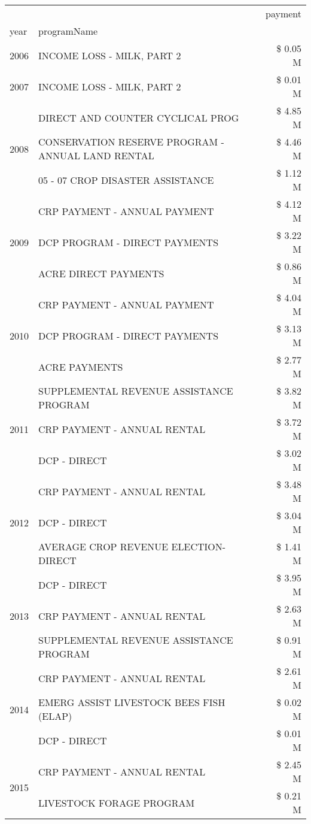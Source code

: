 \begin{tabular}{llr}
\toprule
 &  & payment \\
year & programName &  \\
\midrule
2006 & INCOME LOSS - MILK, PART 2 & \$ 0.05 M \\
\cline{1-3}
2007 & INCOME LOSS - MILK, PART 2 & \$ 0.01 M \\
\cline{1-3}
\multirow[t]{3}{*}{2008} & DIRECT AND COUNTER CYCLICAL PROG & \$ 4.85 M \\
 & CONSERVATION RESERVE PROGRAM - ANNUAL LAND RENTAL & \$ 4.46 M \\
 & 05 - 07 CROP DISASTER ASSISTANCE & \$ 1.12 M \\
\cline{1-3}
\multirow[t]{3}{*}{2009} & CRP PAYMENT - ANNUAL PAYMENT & \$ 4.12 M \\
 & DCP PROGRAM - DIRECT PAYMENTS & \$ 3.22 M \\
 & ACRE DIRECT PAYMENTS & \$ 0.86 M \\
\cline{1-3}
\multirow[t]{3}{*}{2010} & CRP PAYMENT - ANNUAL PAYMENT & \$ 4.04 M \\
 & DCP PROGRAM - DIRECT PAYMENTS & \$ 3.13 M \\
 & ACRE PAYMENTS & \$ 2.77 M \\
\cline{1-3}
\multirow[t]{3}{*}{2011} & SUPPLEMENTAL REVENUE ASSISTANCE PROGRAM & \$ 3.82 M \\
 & CRP PAYMENT - ANNUAL RENTAL & \$ 3.72 M \\
 & DCP - DIRECT & \$ 3.02 M \\
\cline{1-3}
\multirow[t]{3}{*}{2012} & CRP PAYMENT - ANNUAL RENTAL & \$ 3.48 M \\
 & DCP - DIRECT & \$ 3.04 M \\
 & AVERAGE CROP REVENUE ELECTION-DIRECT & \$ 1.41 M \\
\cline{1-3}
\multirow[t]{3}{*}{2013} & DCP - DIRECT & \$ 3.95 M \\
 & CRP PAYMENT - ANNUAL RENTAL & \$ 2.63 M \\
 & SUPPLEMENTAL REVENUE ASSISTANCE PROGRAM & \$ 0.91 M \\
\cline{1-3}
\multirow[t]{3}{*}{2014} & CRP PAYMENT - ANNUAL RENTAL & \$ 2.61 M \\
 & EMERG ASSIST LIVESTOCK BEES FISH (ELAP) & \$ 0.02 M \\
 & DCP - DIRECT & \$ 0.01 M \\
\cline{1-3}
\multirow[t]{3}{*}{2015} & CRP PAYMENT - ANNUAL RENTAL & \$ 2.45 M \\
 & LIVESTOCK FORAGE PROGRAM & \$ 0.21 M \\

\end{tabular}
